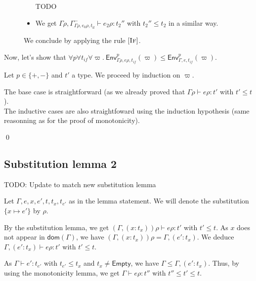 \documentclass[a4paper]{article}%
\newcommand{\dom}[1]{\textsf{dom}(#1)}
\newcommand{\Empty} {\textsf{Empty}}%
\newcommand{\subst}[2]{\{#1 \mapsto #2\}}
\newcommand{\Gp}[2]{\textsf{Env}^{#1}_{#2}}
\theoremstyle{definition}
\newcommand {\Rule}[1] {[\textsc{#1}]}
\begin{document}
\begin{description}
\begin{itemize}
            TODO
    
            \item We get $\Gamma\rho, \Gamma^-_{\Gamma\rho,e_0\rho,t_{\text{if}}}\vdash e_2\rho:t_2''$ with $t_2'' \leq t_2$ in a similar way.
          \end{itemize}
          We conclude by applying the rule $\Rule {If}$.
        \end{description}
    
        Now, let's show that $\forall p \forall t_{if} \forall \varpi.\ \Gp p {\Gamma\rho,e\rho,t_{if}} (\varpi) \leq \Gp p {\Gamma,e,t_{if}} (\varpi)$.
    
        Let $p\in \{+,-\}$ and $t'$ a type.
        We proceed by induction on $\varpi$.
    
        The base case is straightforward (as we already proved that $\Gamma \rho \vdash e \rho:t'$ with $t'\leq t$).\\
        The inductive cases are also straightfoward using the induction hypothesis (same reasonning as for the proof of monotonicity).
    
        \qed
    
        \subsection{Substitution lemma 2}

        TODO: Update to match new substitution lemma
    
        Let $\Gamma,e,x,e',t,t_x,t_{e'}$ as in the lemma statement.
        We will denote the substitution $\subst x {e'}$ by $\rho$.
    
        By the substitution lemma, we get $(\Gamma, (x:t_x))\rho \vdash e\rho:t'$ with $t' \leq t$.
        As $x$ does not appear in $\dom \Gamma$, we have $(\Gamma, (x:t_x))\rho = \Gamma, (e':t_x)$.
        We deduce $\Gamma, (e':t_x) \vdash e\rho:t'$ with $t' \leq t$.
    
        As $\Gamma \vdash e':t_{e'}$ with $t_{e'} \leq t_x$ and $t_x \neq \Empty$, we have $\Gamma \leq \Gamma, (e':t_x)$.
        Thus, by using the monotonicity lemma, we get $\Gamma\vdash e\rho:t''$ with $t'' \leq t' \leq t$.
    
\end{document}
